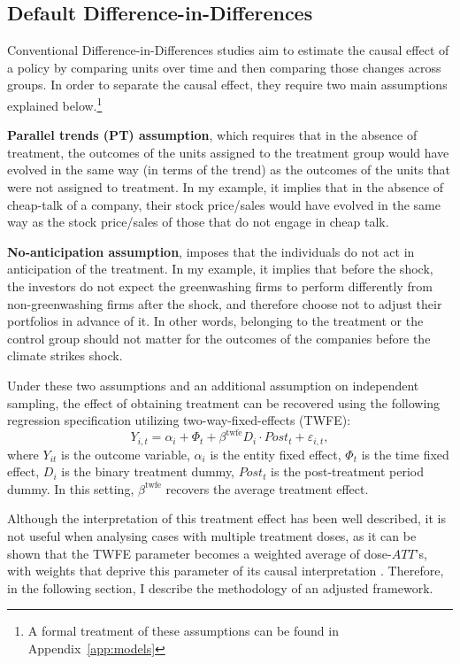 \documentclass[12pt]{article}
\begin{document}
\subsection{Default Difference-in-Differences}

Conventional Difference-in-Differences studies aim to estimate the causal effect of a policy by comparing units over time and then comparing those changes across groups. In order to separate the causal effect, they require two main assumptions explained below.\footnote{A formal treatment of these assumptions can be found in Appendix~\ref{app:models}} 

\textbf{Parallel trends (PT) assumption}, which requires that in the absence of treatment, the outcomes of the units assigned to the treatment group would have evolved in the same way (in terms of the trend) as the outcomes of the units that were not assigned to treatment. In my example, it implies that in the absence of cheap-talk of a company, their stock price/sales would have evolved in the same way as the stock price/sales of those that do not engage in cheap talk. 

\textbf{No-anticipation assumption}, imposes that the individuals do not act in anticipation of the treatment. In my example, it implies that before the shock, the investors do not expect the greenwashing firms to perform differently from non-greenwashing firms after the shock, and therefore choose not to adjust their portfolios in advance of it. In other words, belonging to the treatment or the control group should not matter for the outcomes of the companies before the climate strikes shock.

Under these two assumptions and an additional assumption on independent sampling, the effect of obtaining treatment can be recovered using the following regression specification utilizing two-way-fixed-effects (TWFE):
\begin{equation}
    Y_{i,t} = \alpha_i + \Phi_t + \beta^{\text{twfe}} D_{i} \cdot Post_{t} + \varepsilon_{i,t},
\end{equation}
where $Y_{it}$ is the outcome variable, $\alpha_i$ is the entity fixed effect, $\Phi_t$ is the time fixed effect, $D_i$ is the binary treatment dummy, $Post_t$ is the post-treatment period dummy. In this setting, $\beta^{\text{twfe}}$ recovers the average treatment effect.

Although the interpretation of this treatment effect has been well described, it is not useful when analysing cases with multiple treatment doses, as it can be shown that the TWFE parameter becomes a weighted average of dose-$ATT$'s, with weights that deprive this parameter of its causal interpretation \parencite{callawayDifferenceinDifferencesContinuousTreatment2025}. Therefore, in the following section, I describe the methodology of an adjusted framework.
\end{document}
